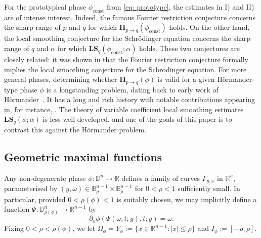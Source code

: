 \documentclass[reqno]{amsart}
\numberwithin{equation}{section}
\newcommand{\B}{\mathbb{B}}
\newcommand{\D}{\mathbb{D}}
\newcommand{\R}{\mathbb{R}}
\newcommand{\bH}{\mathbf{H}}
\newcommand{\bLS}{\mathbf{LS}}
\theoremstyle{plain}
\theoremstyle{definition}
\begin{document}
 For the prototypical phase $\phi_{\mathrm{const}}$ from \eqref{eq: prototype}, the estimates in I) and II) are of intense interest. Indeed, the famous Fourier restriction conjecture concerns the sharp range of $p$ and $q$ for which $\bH_{p \to q}(\phi_{\mathrm{const}})$ holds. On the other hand, the local smoothing conjecture for the Schr\"odinger equation concerns the sharp range of $q$ and $\alpha$ for which $\bLS_q(\phi_{\mathrm{const}}; \alpha)$ holds. These two conjectures are closely related: it was shown in \cite[Theorem 9]{Rogers2008} that the Fourier restriction conjecture formally implies the local smoothing conjecture for the Schr\"odinger equation. 
For more general phases, determining whether $\bH_{p \to q}(\phi)$ is valid for a given H\"ormander-type phase $\phi$ is a longstanding problem, dating back to early work of H\"ormander~\cite{Hormander1973}. It has a long and rich history with notable contributions appearing in, for instance, \cite{Bourgain1991, Wisewell2005, Lee2006, BG2011, GHI2019, guo2022dichotomy}. The theory of variable coefficient local smoothing estimates $\bLS_q(\phi; \alpha)$ is less well-developed, and one of the goals of this paper is to contrast this against the H\"ormander problem.  



\subsection{Geometric maximal functions}\label{subsec: geometric max}
Any non-degenerate phase $\phi \colon \D^n \to \R$ defines a family of curves $\Gamma_{y,\omega}$ in $\R^n$, parameterised by $(y,\omega) \in \B_{\rho}^{n-1} \times \B_{\rho}^{n-1}$ for $0 < \rho < 1$ sufficiently small. In particular, provided $0 < \rho(\phi) < 1$ is suitably chosen, we may implicitly define a function $\Psi \colon \D_{\rho(\phi)}^n \to \R^{n-1}$ by 
\begin{equation}\label{eq: Psi}
    \partial_y \phi(\Psi(\omega; t ;y), t ; y) = \omega.
\end{equation}
Fixing $0 < \rho < \rho(\phi)$, we let $\Omega_{\phi} = Y_{\phi} := \{x \in \R^{n-1} : |x| \leq \rho\}$ and $I_{\phi}  := [-\rho, \rho]$.
\end{document}
